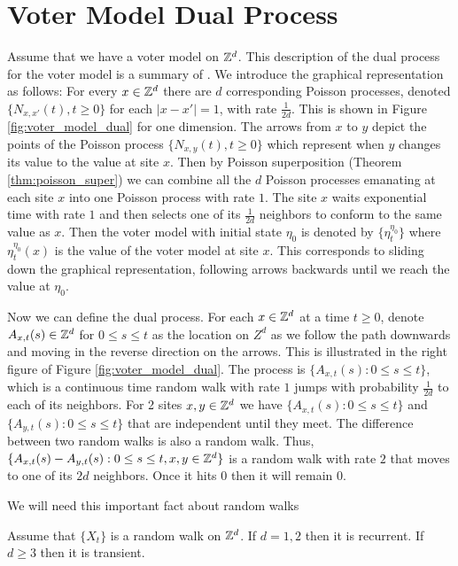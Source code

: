 \section{Voter Model Dual Process}

Assume that we have a voter model on $\mathbb{Z}^d$.
This description of the dual process for the voter model is a summary of \cite{Liggett1999}.
We introduce the graphical representation as follows: For every $x \in \mathbb{Z}^d$ there are $d$ corresponding Poisson processes, denoted $\{N_{x,x'}(t), t \geq 0\}$ for each $|x - x'| = 1$, with rate $\frac{1}{2d}$.
This is shown in Figure \ref{fig:voter_model_dual} for one dimension.
The arrows from $x$ to $y$ depict the points of the Poisson process $\{N_{x,y}(t), t \geq 0\}$ which represent when $y$ changes its value to the value at site $x$.
Then by Poisson superposition (Theorem \ref{thm:poisson_super}) we can combine all the $d$ Poisson processes emanating at each site $x$ into one Poisson process with rate $1$.
The site $x$ waits exponential time with rate $1$ and then selects one of its $\frac{1}{2d}$ neighbors to conform to the same value as $x$.
Then the voter model with initial state $\eta_0$ is denoted by $\{\eta_t^{\eta_0}\}$ where $\eta_t^{\eta_0}(x)$ is the value of the voter model at site $x$.
This corresponds to sliding down the graphical representation, following arrows backwards until we reach the value at $\eta_0$.

Now we can define the dual process.
For each $x \in \mathbb{Z}^d$ at a time $t \geq 0$, 
denote $A_{x,t}(s) \in \mathbb{Z}^d$ for $0 \leq s \leq t$ as the location on $Z^d$ as we follow the path downwards and moving in the reverse direction on the arrows. This is illustrated in the right figure of Figure \ref{fig:voter_model_dual}.
The process is $\{A_{x,t}(s) : 0 \leq s \leq t\}$, which is a continuous time random walk with rate $1$ jumps with probability $\frac{1}{2d}$ to each of its neighbors.
For 2 sites $x, y \in \mathbb{Z}^d$ we have 
$\{A_{x,t}(s) : 0 \leq s \leq t\}$ and $\{A_{y,t}(s) : 0 \leq s \leq t\}$ that are independent until they meet.
The difference between two random walks is also a random walk.
Thus, $\{A_{x,t}(s) - A_{y,t}(s) : 0 \leq s \leq t, x,y \in \mathbb{Z}^d\}$ is a random walk with rate $2$ that moves to one of its $2d$ neighbors.
Once it hits 0 then it will remain 0.

We will need this important fact about random walks

\begin{theorem} \label{thm:rw_recurrent}
Assume that $\{X_t\}$ is a random walk on $\mathbb{Z}^d$.
If $d = 1,2$ then it is recurrent.
If $d \geq 3$ then it is transient.
\end{theorem}

